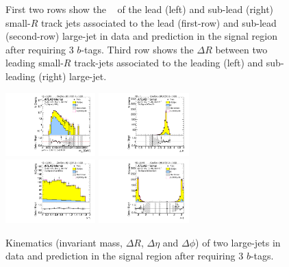 \begin{figure}[htbp!]
\begin{center}
  \caption{First two rows show the \pt~ of the lead (left) and sub-lead (right) small-$R$ track jets associated to the lead (first-row) and sub-lead (second-row) large-\R jet in data and prediction in the signal region after requiring 3 $b$-tags. Third row shows the $\Delta R$ between two leading small-$R$ track-jets associated to the leading (left) and sub-leading (right) large-\R jet.  }
  \label{fig:boosted-3b-signal-ak2}
\end{center}
\end{figure}


\begin{figure}[htbp!]
\begin{center}
\includegraphics[width=0.31\textwidth,angle=-90]{figures/boosted/Signal/b77_ThreeTag_Signal_mHH_l_1.pdf}
\includegraphics[width=0.31\textwidth,angle=-90]{figures/boosted/Signal/b77_ThreeTag_Signal_hCandDr.pdf}\\
\includegraphics[width=0.31\textwidth,angle=-90]{figures/boosted/Signal/b77_ThreeTag_Signal_hCandDeta.pdf}
\includegraphics[width=0.31\textwidth,angle=-90]{figures/boosted/Signal/b77_ThreeTag_Signal_hCandDphi.pdf}
  \caption{Kinematics (invariant mass, $\Delta R$, $\Delta \eta$ and $\Delta \phi$) of two large-\R jets in data and prediction in the signal region after requiring 3 $b$-tags.  }
  \label{fig:boosted-3b-signal-ak10-system}
\end{center}
\end{figure}

